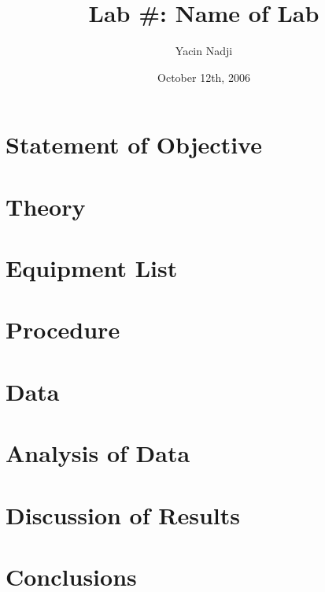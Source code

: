 \documentclass[titlepage]{article}
\title{Lab #: Name of Lab}
\author{Yacin Nadji}
\date{October 12th, 2006}
\begin{document}
\maketitle

\section{Statement of Objective}\label{sec:obj}

\section{Theory}\label{sec:theory}

\section{Equipment List}\label{sec:equipment_list}

\section{Procedure}\label{sec:procedure}

\section{Data}\label{sec:data}

\section{Analysis of Data}\label{sec:analysis_of_data}

\section{Discussion of Results}\label{sec:discussion_of_results}

\section{Conclusions}\label{sec:conclusions}
\end{document}

